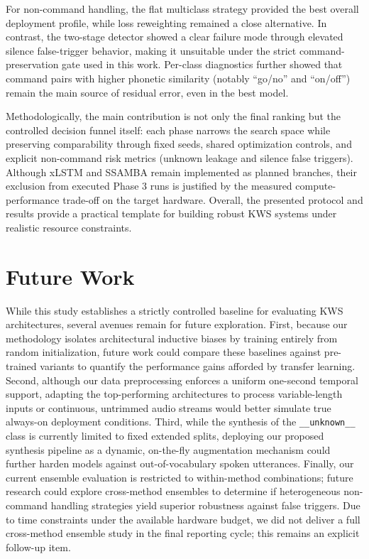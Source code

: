 \documentclass[cameraready]{Interspeech}
\begin{document}
For non-command handling, the flat multiclass strategy provided the best overall deployment profile, while loss reweighting remained a close alternative. In contrast, the two-stage detector showed a clear failure mode through elevated silence false-trigger behavior, making it unsuitable under the strict command-preservation gate used in this work. Per-class diagnostics further showed that command pairs with higher phonetic similarity (notably ``go/no'' and ``on/off'') remain the main source of residual error, even in the best model.

Methodologically, the main contribution is not only the final ranking but the controlled decision funnel itself: each phase narrows the search space while preserving comparability through fixed seeds, shared optimization controls, and explicit non-command risk metrics (unknown leakage and silence false triggers). Although xLSTM and SSAMBA remain implemented as planned branches, their exclusion from executed Phase $3$ runs is justified by the measured compute-performance trade-off on the target hardware. Overall, the presented protocol and results provide a practical template for building robust KWS systems under realistic resource constraints.

\section{Future Work}
While this study establishes a strictly controlled baseline for evaluating KWS architectures, several avenues remain for future exploration. First, because our methodology isolates architectural inductive biases by training entirely from random initialization, future work could compare these baselines against pre-trained variants to quantify the performance gains afforded by transfer learning. Second, although our data preprocessing enforces a uniform one-second temporal support, adapting the top-performing architectures to process variable-length inputs or continuous, untrimmed audio streams would better simulate true always-on deployment conditions. Third, while the synthesis of the \texttt{\_\_unknown\_\_} class is currently limited to fixed extended splits, deploying our proposed synthesis pipeline as a dynamic, on-the-fly augmentation mechanism could further harden models against out-of-vocabulary spoken utterances. Finally, our current ensemble evaluation is restricted to within-method combinations; future research could explore cross-method ensembles to determine if heterogeneous non-command handling strategies yield superior robustness against false triggers.
Due to time constraints under the available hardware budget, we did not deliver a full cross-method ensemble study in the final reporting cycle; this remains an explicit follow-up item.
\end{document}

